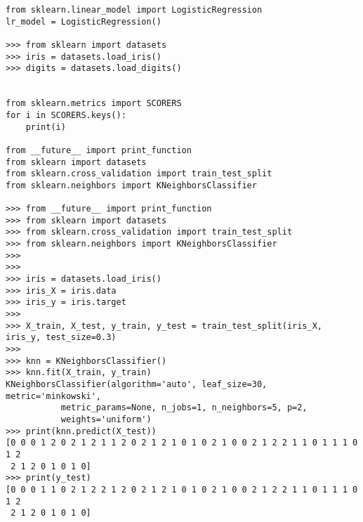 \begin{verbatim}
from sklearn.linear_model import LogisticRegression
lr_model = LogisticRegression()

>>> from sklearn import datasets
>>> iris = datasets.load_iris()
>>> digits = datasets.load_digits()


from sklearn.metrics import SCORERS
for i in SCORERS.keys():
    print(i)

from __future__ import print_function
from sklearn import datasets
from sklearn.cross_validation import train_test_split
from sklearn.neighbors import KNeighborsClassifier

>>> from __future__ import print_function
>>> from sklearn import datasets
>>> from sklearn.cross_validation import train_test_split
>>> from sklearn.neighbors import KNeighborsClassifier
>>> 
>>> 
>>> iris = datasets.load_iris()
>>> iris_X = iris.data
>>> iris_y = iris.target
>>> 
>>> X_train, X_test, y_train, y_test = train_test_split(iris_X, iris_y, test_size=0.3)
>>> 
>>> knn = KNeighborsClassifier()
>>> knn.fit(X_train, y_train)
KNeighborsClassifier(algorithm='auto', leaf_size=30, metric='minkowski',
           metric_params=None, n_jobs=1, n_neighbors=5, p=2,
           weights='uniform')
>>> print(knn.predict(X_test))
[0 0 0 1 2 0 2 1 2 1 1 2 0 2 1 2 1 0 1 0 2 1 0 0 2 1 2 2 1 1 0 1 1 1 0 1 2
 2 1 2 0 1 0 1 0]
>>> print(y_test)
[0 0 0 1 1 0 2 1 2 2 1 2 0 2 1 2 1 0 1 0 2 1 0 0 2 1 2 2 1 1 0 1 1 1 0 1 2
 2 1 2 0 1 0 1 0]
\end{verbatim}

\ifx\engineeringnotes\undefined
    
\fi
